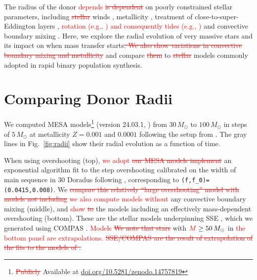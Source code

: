 \documentclass[twocolumn]{aastex63}
\DeclareRobustCommand{\Figref}[1]{Fig.~\ref{#1}}
\newcommand{\cut}[1]{\textcolor{red}{\sout{#1}}}
\begin{document}
The radius of the donor \textcolor{red}{depends} \cut{is dependent} on
poorly constrained stellar parameters, including \cut{stellar} winds
\citep{renzo:17, josiek:24}, metallicity \citep{xin:22}, treatment of
close-to-super-Eddington layers \citep[e.g.,][]{joss:73, paxton:13,
  jiang:15, agrawal:22, jermyn:23}, \textcolor{red}{rotation (e.g.,
  \citealt{maeder:00}) and consequently tides (e.g.,
  \citealt{fabry:22})} and convective boundary mixing
\citep{anders:23, johnston:24}. Here, we explore the radial evolution
of very massive stars and its impact on when mass transfer
starts\cut{. We also show variations in convective boundary mixing and
  metallicity} and compare \cut{them} to \cut{stellar} models commonly
adopted in rapid binary population synthesis.

\section{Comparing Donor Radii}

We computed \textsc{MESA} models\footnote{\cut{Publicly} Available at
  \href{https://doi.org/10.5281/zenodo.14757819}{doi.org/10.5281/zenodo.14757819}}
(version 24.03.1, \citealt{paxton:11, paxton:13, paxton:15, paxton:18,
  paxton:19, jermyn:23}) from $30 \, M_{\odot}$ to $100 \, M_{\odot}$
in steps of $5\,M_\odot$ at metallicity $Z=0.001$ and $0.0001$
following the setup from \cite{renzo:23}. The gray lines in
\Figref{fig:radii} show their radial evolution as a function of time.

When using overshooting (top), \textcolor{red}{we adopt} \cut{our
  \textsc{MESA} models implement} an exponential algorithm
\citep{herwig:00} fit to the step overshooting calibrated on the width
of main sequence in 30 Doradus \citep[$\sim{}0.335$ pressure scale
heights,][]{brott:11} following \cite{claret:18}, corresponding to
\texttt{(f,f\_0)=(0.0415,0.008)}. We \cut{compare this relatively
  ``large overshooting'' model with models not including}
\textcolor{red}{we also compute models without} any convective boundary
mixing (middle), and \textcolor{red}{show} \cut{to} the \cite{pols:98}
models including an effectively mass-dependent overshooting (bottom).
These are the stellar models underpinning \textsc{SSE}
\citep{hurley:00}, which we generated using \textsc{COMPAS}
\citep{stevenson:17, vignagomez:18, riley:22}. \textcolor{red}{Models}
\cut{We note that stars} with $\textcolor{red}{M}\geq50\,M_\odot$ in
\textcolor{red}{the bottom panel are extrapolations.}
\cut{\textsc{SSE}/\textsc{COMPAS} are the result of extrapolation of the
fits to the models of \cite{pols:98}.}
\end{document}
